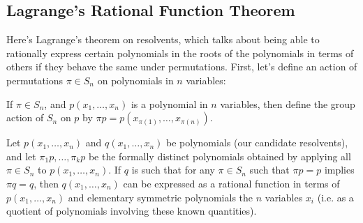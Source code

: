 \documentclass[12pt]{scrartcl}
\begin{document}
\subsection{Lagrange's Rational Function Theorem}
Here's Lagrange's theorem on resolvents, which talks about being able to rationally express certain polynomials in the roots of the polynomials in terms of others if they behave the same under permutations. First, let's define an action of permutations $\pi \in S_n$ on polynomials in $n$ variables: 
\begin{definition}
    If $\pi \in S_n$, and $p(x_1, \dots, x_n)$ is a polynomial in $n$ variables, then define the group action of $S_n$ on $p$ by $\pi p = p(x_{\pi(1)}, \dots, x_{\pi(n)})$. 
\end{definition}
\begin{theorem}
    Let $p(x_1, \dots, x_n)$ and $q(x_1, \dots, x_n)$ be polynomials (our candidate resolvents), and let $\pi_1 p, \dots, \pi_k p$ be the formally distinct polynomials obtained by applying all $\pi \in S_n$ to $p(x_1, \dots, x_n)$. If $q$ is such that for any $\pi \in S_n$ such that $\pi p = p$ implies $\pi q = q$, then $q(x_1, \dots, x_n)$ can be expressed as a rational function in terms of $p(x_1, \dots, x_n)$ and elementary symmetric polynomials the $n$ variables $x_i$ (i.e. as a quotient of polynomials involving these known quantities).  
\end{theorem}
\end{document}
